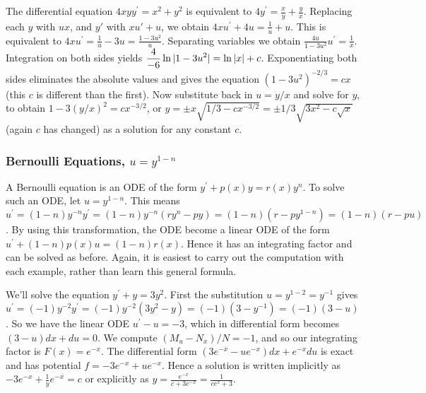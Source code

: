 \begin{example}
The differential equation $4xy y^\prime = x^2+y^2$ is equivalent to $4y^\prime=\frac{x}{y}+\frac{y}{x}$. Replacing each $y$ with $ux$, and $y'$ with $xu'+u$, we obtain $4xu^\prime+4u = \frac{1}{u}+u$. This is equivalent to $4xu^\prime = \frac{1}{u}-3u=\frac{1-3u^2}{u}$.  Separating variables we obtain $\frac{4u}{1-3u^2}u^\prime = \frac{1}{x}$. Integration on both sides yields $\displaystyle \frac{4}{-6}\ln|1-3u^2| = \ln|x|+c$. Exponentiating both sides eliminates the absolute values and gives the equation $(1-3u^2)^{-2/3} = cx$ (this $c$ is different than the first). Now substitute back in $u=y/x$ and solve for $y$, to obtain $1-3(y/x)^2 = cx^{-3/2}$, or $y=\pm x\sqrt{1/3- cx^{-3/2}}=\pm 1/3\sqrt{3x^2- c\sqrt{x}}$ (again $c$ has changed) as a solution for any constant $c$. 
\end{example}

\subsubsection{Bernoulli Equations, $u=y^{1-n}$}
A Bernoulli equation is an ODE of the form $y^\prime+p(x)y=r(x)y^n$. To solve such an ODE, let $u=y^{1-n}$. This means $u^\prime = (1-n)y^{-n}y^\prime = (1-n)y^{-n}(ry^n-py) = (1-n)(r-py^{1-n}) = (1-n)(r-pu)$.  By using this transformation, the ODE become a linear ODE of the form $u^\prime +(1-n)p(x)u=(1-n)r(x)$. Hence it has an integrating factor and can be solved as before. Again, it is easiest to carry out the computation with each example, rather than learn this general formula. 

\begin{example}
We'll solve the equation $y^\prime+y=3y^2$. First the substitution $u=y^{1-2}=y^{-1}$ gives $u^\prime = (-1)y^{-2}y^\prime = (-1)y^{-2}(3y^2-y) = (-1)(3-y^{-1}) = (-1)(3-u)$. So we have the linear ODE $u^\prime-u=-3$, which in differential form becomes $(3-u)dx+du=0$.  We compute $(M_u-N_x)/N=-1$, and so our integrating factor is $F(x)=e^{-x}$. The differential form   $(3e^{-x}-ue^{-x})dx+e^{-x}du$ is exact and has potential $f=-3e^{-x}+ue^{-x}$. Hence a solution is written implicitly as $-3e^{-x}+\frac{1}{y}e^{-x}=c$ or explicitly as $y=\frac{e^{-x}}{c+3e^{-x}} = \frac{1}{ce^x+3}$.
\end{example}


